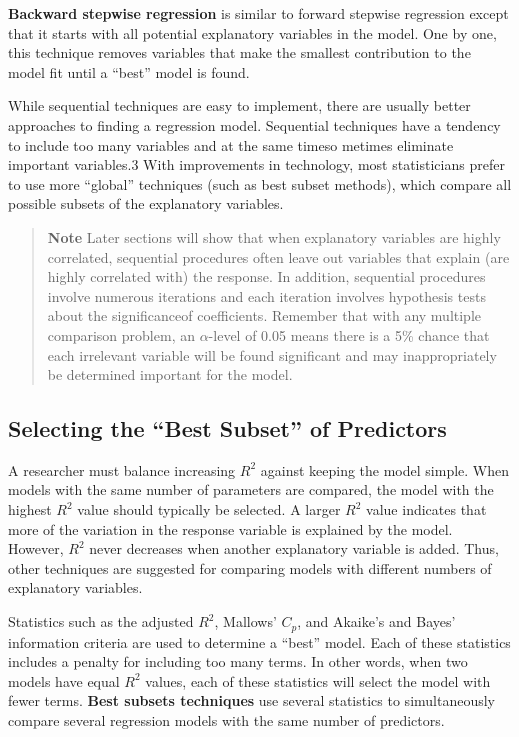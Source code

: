 \documentclass[
]{report}
\theoremstyle{definition}
\theoremstyle{definition}
\theoremstyle{definition}
\theoremstyle{definition}
\theoremstyle{remark}
\begin{document}
\textbf{Backward stepwise regression} is similar to forward stepwise regression except that it starts with all potential explanatory variables in the model. One by one, this technique removes variables that make the smallest contribution to the model fit until a ``best'' model is found.

While sequential techniques are easy to implement, there are usually better approaches to finding a regression model. Sequential techniques have a tendency to include too many variables and at the same timeso metimes eliminate important variables.3 With improvements in technology, most statisticians prefer to use more ``global'' techniques (such as best subset methods), which compare all possible subsets of the explanatory variables.

\begin{quote}
\textbf{Note} Later sections will show that when explanatory variables are highly correlated, sequential procedures often leave out variables that explain (are highly correlated with) the response. In addition, sequential procedures involve numerous iterations and each iteration involves hypothesis tests about the significanceof coefficients. Remember that with any multiple comparison problem, an \(\alpha\)-level of 0.05 means there is a 5\% chance that each irrelevant variable will be found significant and may inappropriately be determined important for the model.
\end{quote}

\hypertarget{selecting-the-best-subset-of-predictors}{%
\subsection{Selecting the ``Best Subset'' of Predictors}\label{selecting-the-best-subset-of-predictors}}

A researcher must balance increasing \(R^2\) against keeping the model simple. When models with the same number of parameters are compared, the model with the highest \(R^2\) value should typically be selected. A larger \(R^2\) value indicates that more of the variation in the response variable is explained by the model. However, \(R^2\) never decreases when another explanatory variable is added. Thus, other techniques are suggested for comparing models with different numbers of explanatory variables.

Statistics such as the adjusted \(R^2\), Mallows' \(C_p\), and Akaike's and Bayes' information criteria are used to determine a ``best'' model. Each of these statistics includes a penalty for including too many terms. In other words, when two models have equal \(R^2\) values, each of these statistics will select the model with fewer terms. \textbf{Best subsets techniques} use several statistics to simultaneously compare several regression models with the same number of predictors.
\end{document}
